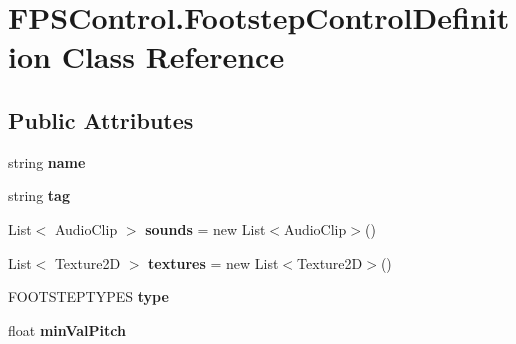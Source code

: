\hypertarget{class_f_p_s_control_1_1_footstep_control_definition}{\section{F\-P\-S\-Control.\-Footstep\-Control\-Definition Class Reference}
\label{class_f_p_s_control_1_1_footstep_control_definition}
}
\subsection*{Public Attributes}
\begin{DoxyCompactItemize}
\item 
\hypertarget{class_f_p_s_control_1_1_footstep_control_definition_a18a09046af4d58eae4b14f004dbaa946}{string {\bfseries name}}\label{class_f_p_s_control_1_1_footstep_control_definition_a18a09046af4d58eae4b14f004dbaa946}

\item 
\hypertarget{class_f_p_s_control_1_1_footstep_control_definition_ab824a1f8cf1ce5d1734835daafe9bf72}{string {\bfseries tag}}\label{class_f_p_s_control_1_1_footstep_control_definition_ab824a1f8cf1ce5d1734835daafe9bf72}

\item 
\hypertarget{class_f_p_s_control_1_1_footstep_control_definition_a5a2885752e24e4a342ade1c67e4c88da}{List$<$ Audio\-Clip $>$ {\bfseries sounds} = new List$<$Audio\-Clip$>$()}\label{class_f_p_s_control_1_1_footstep_control_definition_a5a2885752e24e4a342ade1c67e4c88da}

\item 
\hypertarget{class_f_p_s_control_1_1_footstep_control_definition_a63da47ebe70f25e5992895bfa2f1cb49}{List$<$ Texture2\-D $>$ {\bfseries textures} = new List$<$Texture2\-D$>$()}\label{class_f_p_s_control_1_1_footstep_control_definition_a63da47ebe70f25e5992895bfa2f1cb49}

\item 
\hypertarget{class_f_p_s_control_1_1_footstep_control_definition_a377caa48fcb783f27a5c452e9eeb2827}{F\-O\-O\-T\-S\-T\-E\-P\-T\-Y\-P\-E\-S {\bfseries type}}\label{class_f_p_s_control_1_1_footstep_control_definition_a377caa48fcb783f27a5c452e9eeb2827}

\item 
\hypertarget{class_f_p_s_control_1_1_footstep_control_definition_a3bcb662808601e3a1eddb894aec7c0e8}{float {\bfseries min\-Val\-Pitch}}\label{class_f_p_s_control_1_1_footstep_control_definition_a3bcb662808601e3a1eddb894aec7c0e8}


\end{DoxyCompactItemize}
